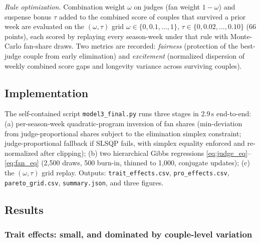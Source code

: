 \documentclass[11pt]{article}
\begin{document}
\emph{Rule optimization.} Combination weight $\omega$ on judges (fan weight
$1-\omega$) and suspense bonus $\tau$ added to the combined score of couples that
survived a prior week are evaluated on the $(\omega, \tau)$ grid
$\omega \in \{0, 0.1, \dots, 1\}$, $\tau \in \{0, 0.02, \dots, 0.10\}$ (66 points),
each scored by replaying every season-week under that rule with Monte-Carlo fan-share
draws. Two metrics are recorded: \emph{fairness} (protection of the best-judge couple
from early elimination) and \emph{excitement} (normalized dispersion of weekly combined
score gaps and longevity variance across surviving couples).

\subsection{Implementation}

The self-contained script \texttt{model3\_final.py} runs three stages in 2.9\,s
end-to-end: (a) per-season-week quadratic-program inversion of fan shares (min-deviation
from judge-proportional shares subject to the elimination simplex constraint;
judge-proportional fallback if SLSQP fails, with simplex equality enforced and
re-normalized after clipping); (b) two hierarchical Gibbs regressions
\eqref{eq:judge_eq}--\eqref{eq:fan_eq} (2{,}500 draws, 500 burn-in, thinned to 1{,}000,
conjugate updates); (c) the $(\omega,\tau)$ grid replay. Outputs:
\texttt{trait\_effects.csv}, \texttt{pro\_effects.csv}, \texttt{pareto\_grid.csv},
\texttt{summary.json}, and three figures.

\subsection{Results}

\subsubsection{Trait effects: small, and dominated by couple-level variation}
\end{document}
